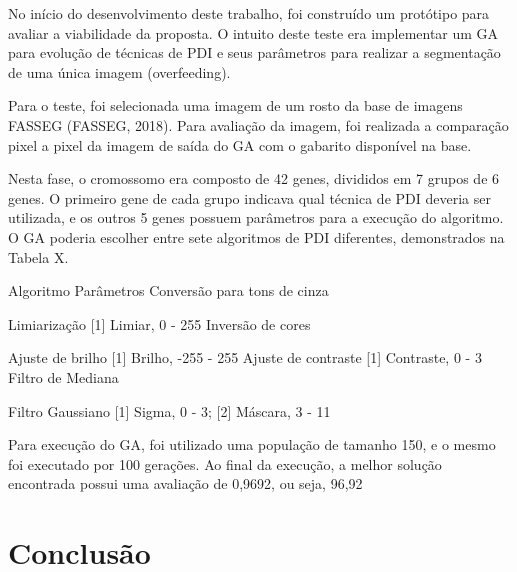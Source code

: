 \documentclass[12pt,oneside,a4paper,english,french,spanish,brazil,]{abntex2}
\begin{document}
No início do desenvolvimento deste trabalho, foi construído um protótipo para avaliar a viabilidade da proposta. O intuito deste teste era implementar um GA para evolução de técnicas de PDI e seus parâmetros para realizar a segmentação de uma única imagem (overfeeding).

Para o teste, foi selecionada uma imagem de um rosto da base de imagens FASSEG (FASSEG, 2018). Para avaliação da imagem, foi realizada a comparação pixel a pixel da imagem de saída do GA com o gabarito disponível na base.

Nesta fase, o cromossomo era composto de 42 genes, divididos em 7 grupos de 6 genes. O primeiro gene de cada grupo indicava qual técnica de PDI deveria ser utilizada, e os outros 5 genes possuem parâmetros para a execução do algoritmo. O GA poderia escolher entre sete algoritmos de PDI diferentes, demonstrados na Tabela X.

Algoritmo
Parâmetros
Conversão para tons de cinza


Limiarização
[1] Limiar, 0 - 255
Inversão de cores


Ajuste de brilho
[1] Brilho, -255 - 255
Ajuste de contraste
[1] Contraste, 0 - 3
Filtro de Mediana


Filtro Gaussiano
[1] Sigma, 0 - 3; [2] Máscara, 3 - 11

Para execução do GA, foi utilizado uma população de tamanho 150, e o mesmo foi executado por 100 gerações. Ao final da execução, a melhor solução encontrada possui uma avaliação de 0,9692, ou seja, 96,92%


% 

\chapter*[Conclusão]{Conclusão}

\lipsum[31-33]

\postextual






\printindex
\end{document}
